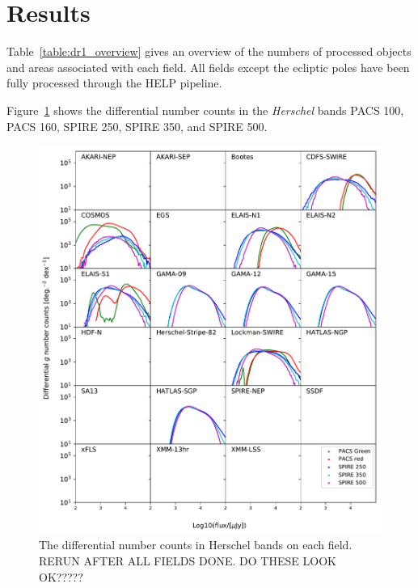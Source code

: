 \documentclass[usenatbib]{mnras}
\begin{document}
\section[Results\\ {\color{red}Being an assessment of the size and quality of the DR1 product, depths, areas, numbers of sources and redshifts distributions, etc.} ]{Results}

Table~\ref{table:dr1_overview} gives an overview of the numbers of processed objects and areas associated with each field. All fields except the ecliptic poles have been fully processed through the HELP pipeline.




Figure~\ref{fig:numbers_allfields} shows the differential number counts in the \emph{Herschel} bands PACS 100, PACS 160, SPIRE 250, SPIRE 350, and SPIRE 500.

\begin{figure} %
\centering
\includegraphics[width=1.0\textwidth]{./figs/numbers_Herschel_allfields}
\caption{\label{fig:numbers_allfields} The differential number counts in Herschel bands on each field. {\color{red} RERUN AFTER ALL FIELDS DONE. DO THESE LOOK OK?????}   }
\end{figure}
\end{document}
